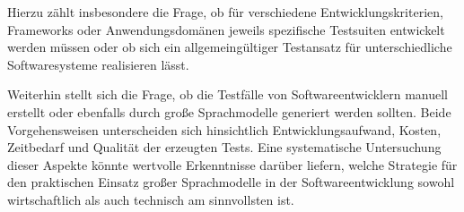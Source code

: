 Hierzu zählt insbesondere die Frage, ob für verschiedene Entwicklungskriterien, Frameworks oder Anwendungsdomänen jeweils spezifische Testsuiten entwickelt werden müssen oder ob sich ein allgemeingültiger Testansatz für unterschiedliche Softwaresysteme realisieren lässt.

Weiterhin stellt sich die Frage, ob die Testfälle von Softwareentwicklern manuell erstellt oder ebenfalls durch große Sprachmodelle generiert werden sollten. Beide Vorgehensweisen unterscheiden sich hinsichtlich Entwicklungsaufwand, Kosten, Zeitbedarf und Qualität der erzeugten Tests. Eine systematische Untersuchung dieser Aspekte könnte wertvolle Erkenntnisse darüber liefern, welche Strategie für den praktischen Einsatz großer Sprachmodelle in der Softwareentwicklung sowohl wirtschaftlich als auch technisch am sinnvollsten ist.
